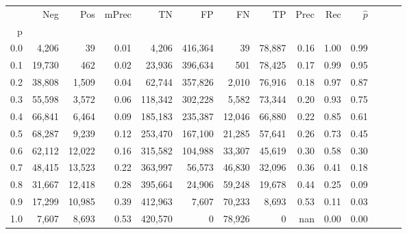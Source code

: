 \begin{tabular}{rrrrrrrrrrrrrr}
\toprule
{} &     Neg &     Pos & mPrec &       TN &       FP &      FN &      TP &  Prec &   Rec & $\hat{p}$ \\
p   &         &         &       &          &          &         &         &       &       &           \\
\midrule
0.0 &   4,206 &      39 &  0.01 &    4,206 &  416,364 &      39 &  78,887 &  0.16 &  1.00 &      0.99 \\
0.1 &  19,730 &     462 &  0.02 &   23,936 &  396,634 &     501 &  78,425 &  0.17 &  0.99 &      0.95 \\
0.2 &  38,808 &   1,509 &  0.04 &   62,744 &  357,826 &   2,010 &  76,916 &  0.18 &  0.97 &      0.87 \\
0.3 &  55,598 &   3,572 &  0.06 &  118,342 &  302,228 &   5,582 &  73,344 &  0.20 &  0.93 &      0.75 \\
0.4 &  66,841 &   6,464 &  0.09 &  185,183 &  235,387 &  12,046 &  66,880 &  0.22 &  0.85 &      0.61 \\
0.5 &  68,287 &   9,239 &  0.12 &  253,470 &  167,100 &  21,285 &  57,641 &  0.26 &  0.73 &      0.45 \\
0.6 &  62,112 &  12,022 &  0.16 &  315,582 &  104,988 &  33,307 &  45,619 &  0.30 &  0.58 &      0.30 \\
0.7 &  48,415 &  13,523 &  0.22 &  363,997 &   56,573 &  46,830 &  32,096 &  0.36 &  0.41 &      0.18 \\
0.8 &  31,667 &  12,418 &  0.28 &  395,664 &   24,906 &  59,248 &  19,678 &  0.44 &  0.25 &      0.09 \\
0.9 &  17,299 &  10,985 &  0.39 &  412,963 &    7,607 &  70,233 &   8,693 &  0.53 &  0.11 &      0.03 \\
1.0 &   7,607 &   8,693 &  0.53 &  420,570 &        0 &  78,926 &       0 &   nan &  0.00 &      0.00 \\
\bottomrule
\end{tabular}
